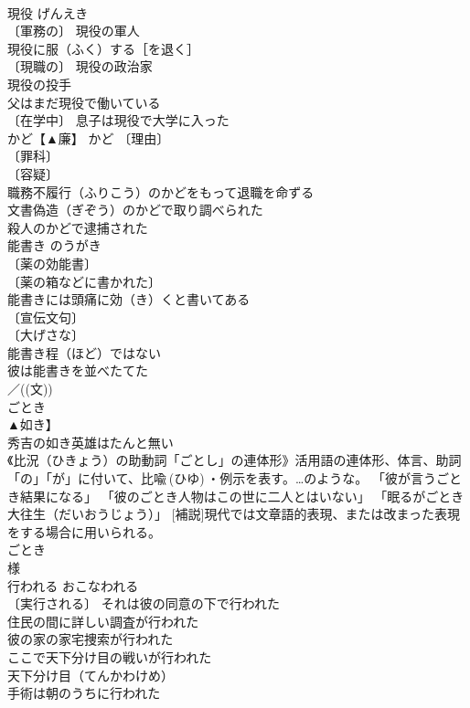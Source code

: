 \documentclass[8pt]{extreport}
\begin{document}
\begin{CJK}{UTF8}{min}
\\	現役	げんえき	
\\	〔軍務の〕 現役の軍人 
\\	現役に服（ふく）する［を退く］ 
\\	〔現職の〕 現役の政治家 
\\	現役の投手 
\\	父はまだ現役で働いている 
\\	〔在学中〕 息子は現役で大学に入った 
\\	かど【▲廉】	かど	〔理由〕
\\	〔罪科〕
\\	〔容疑〕
\\	職務不履行（ふりこう）のかどをもって退職を命ずる 
\\	文書偽造（ぎぞう）のかどで取り調べられた 
\\	殺人のかどで逮捕された 
\\	能書き	のうがき	
\\	〔薬の効能書〕
\\	〔薬の箱などに書かれた〕
\\	能書きには頭痛に効（き）くと書いてある 
\\	〔宣伝文句〕
\\	〔大げさな〕
\\	能書き程（ほど）ではない 
\\	彼は能書きを並べたてた 
\\	／((文)) 
\\	ごとき	
\\	▲如き】	
\\	秀吉の如き英雄はたんと無い 
\\	《比況（ひきょう）の助動詞「ごとし」の連体形》活用語の連体形、体言、助詞「の」「が」に付いて、比喩 (ひゆ) ・例示を表す。…のような。 「彼が言うごとき結果になる」 「彼のごとき人物はこの世に二人とはいない」 「眠るがごとき大往生（だいおうじょう）」 [補説]現代では文章語的表現、または改まった表現をする場合に用いられる。 
\\	ごとき 
\\	様 
\\	行われる	おこなわれる	
\\	〔実行される〕 それは彼の同意の下で行われた 
\\	住民の間に詳しい調査が行われた 
\\	彼の家の家宅捜索が行われた 
\\	ここで天下分け目の戦いが行われた 
\\	天下分け目（てんかわけめ）　
\\	手術は朝のうちに行われた 

\end{CJK}
\end{document}

